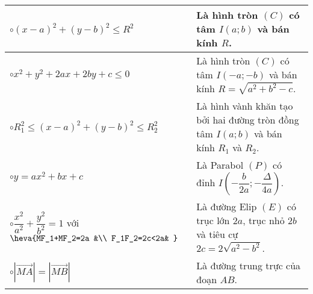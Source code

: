 \begin{tomtat}
\begin{center}
\begin{tabular}{|l|p{7.5cm}|}
			\hline 
			$\circ (x-a)^2+(y-b)^2\leq R^2$ & Là hình tròn $(C)$ có tâm $I(a;b)$ và bán kính $R$.\\ 
			\hline 
			$\circ x^2+y^2+2ax+2by+c\leq 0$ & Là hình tròn $(C)$ có tâm $I(-a;-b)$ và bán kính $R=\sqrt{a^2+b^2-c}$.\\ 
			\hline 
			$\circ R_1^2\leq (x-a)^2+(y-b)^2\leq R_2^2$ & Là hình vành khăn tạo bởi hai đường tròn đồng tâm $I(a;b)$ và bán kính $R_1$ và $R_2$.\\ 
			\hline 
			$\circ y=ax^2+bx+c$ & Là Parabol $(P)$ có đỉnh $I\left( -\dfrac{b}{2a};-\dfrac{\Delta}{4a}\right) $.\\ 
			\hline 
			$\circ \dfrac{x^2}{a^2}+\dfrac{y^2}{b^2}=1$ với 
			$\heva{MF_1+MF_2=2a &\\ F_1F_2=2c<2a& }$ & Là đường Elip $(E)$ có trục lớn  $2a$, trục nhỏ $2b$ và tiêu cự $2c=2\sqrt{a^2-b^2}$.\\ 
			\hline 
			$\circ \left| \overrightarrow{MA}\right|= \left| \overrightarrow{MB}\right|$ & Là đường trung trực của đoạn $AB$.\\ 
			\hline 
		\end{tabular} 
	\end{center}
\end{tomtat}
